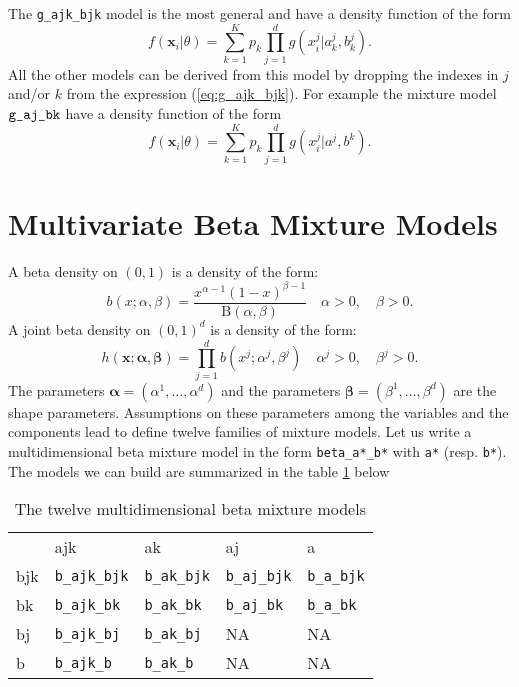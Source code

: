 \documentclass[a4paper,10pt]{article}
\newcommand{\bx}{\mathbf{x}}
\newcommand{\balpha}{\boldsymbol{\alpha}}
\newcommand{\bbeta}{\boldsymbol{\beta}}
\begin{document}
The \verb+g_ajk_bjk+ model is the most general and have a density function of the form
\begin{equation}\label{eq:g_ajk_bjk}
  f({\bx}_i|\theta) = \sum_{k=1}^K p_k \prod_{j=1}^d g(x^j_{i}| a^j_{k},b^j_{k}).
\end{equation}
All the other models can be derived from this model by dropping the indexes in $j$ and/or $k$
from the expression (\ref{eq:g_ajk_bjk}). For example the mixture model $\verb+g_aj_bk+$ have a density
function of the form
\begin{equation}\label{eq:g_aj_bk}
  f({\bx}_i|\theta) = \sum_{k=1}^K p_k \prod_{j=1}^d g(x^j_{i}| a^j,b^{k}).
\end{equation}

\section{Multivariate Beta Mixture Models}

A beta density on $(0,1)$ is a density of the form:
\begin{equation}\label{law::beta-density}
b(x;\alpha,\beta) = \frac{x^{\alpha-1}(1-x)^{\beta-1}} {\mathrm{B}(\alpha,\beta)} \quad \alpha>0, \quad \beta>0.
\end{equation}
A joint beta density on $(0,1)^d$ is a density of the form:
\begin{equation}\label{law::joint-beta-density}
h(\bx;\balpha,\bbeta) = \prod_{j=1}^d b(x^j;\alpha^j,\beta^j) \quad \alpha^j>0, \quad \beta^j>0.
\end{equation}
The parameters $\balpha=(\alpha^1,\ldots,\alpha^d)$ and the parameters $\bbeta=(\beta^1,\ldots,\beta^d)$ are the
shape parameters. Assumptions on these parameters among the variables and the components
lead to define twelve families of mixture models. Let us write a multidimensional beta mixture model in the form
\verb+beta_a*_b*+ with \verb+a*+ (resp. \verb+b*+).
The models we can build are summarized in the table \ref{tab:betamodels} below
\begin{table}[htb]
\begin{center}
\begin{tabular}{lllll}
    &  ajk                    &  ak                     &  aj           &  a \\
bjk & \verb+b_ajk_bjk+  & \verb+b_ak_bjk+ & \verb+b_aj_bjk+ & \verb+b_a_bjk+\\
bk  & \verb+b_ajk_bk+   & \verb+b_ak_bk+  & \verb+b_aj_bk+  & \verb+b_a_bk+  \\
bj  & \verb+b_ajk_bj+   & \verb+b_ak_bj+  & NA  & NA  \\
b   & \verb+b_ajk_b+    & \verb+b_ak_b+   & NA  & NA \\
\end{tabular}
\end{center}
\caption{The twelve multidimensional beta mixture models}
\label{tab:betamodels}
\end{table}
\end{document}
